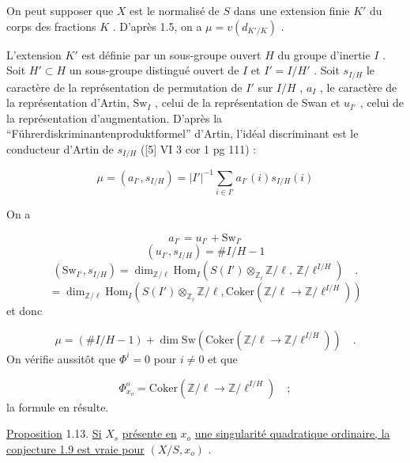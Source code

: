 On peut supposer que $X$ est le normalisé de $S$ dans une extension finie $K'$ du corps des fractions $K$ . D'après 1.5, on a $\mu = v(d_{K'/K})$ .

L'extension $K'$ est définie par un sous-groupe ouvert $H$ du groupe d'inertie $I$ . Soit $H' \subset H$ un sous-groupe distingué ouvert de $I$ et $I' = I/H'$ . Soit $s_{I/H}$ le caractère de la représentation de permutation de $I'$ sur $I/H$ , $a_I$ , le caractère de la représentation d'Artin, $\mathrm{Sw}_I$ , celui de la représentation de Swan et $u_{I'}$ , celui de la représentation d'augmentation. D'après la ``Führerdiskriminantenproduktformel'' d'Artin, l'idéal discriminant est le conducteur d'Artin de $s_{I/H}$ ([5] VI 3 cor 1 pg 111) :

\begin{equation*}
\mu = (a_{I'},s_{I/H}) = |I'|^{-1} \sum_{i \in I'} a_{I'}(i)s_{I/H}(i)
\end{equation*}


On a

\begin{equation*}
a_{I'} = u_{I'} + \mathrm{Sw}_{I'}
\end{equation*}
\begin{equation*}
(u_{I'},s_{I/H}) = \# I/H - 1
\end{equation*}
\begin{equation*}
(\mathrm{Sw}_{I'},s_{I/H}) = \dim_{\mathbb{Z}/\ell} \mathrm{Hom}_I(S(I') \otimes_{\mathbb{Z}_\ell} \mathbb{Z}/\ell, \ \mathbb{Z}/\ell^{I/H}) \quad .
\end{equation*}
\begin{equation*}
= \dim_{\mathbb{Z}/\ell} \mathrm{Hom}_I(S(I') \otimes_{\mathbb{Z}_\ell} \mathbb{Z}/\ell, \mathrm{Coker}( \mathbb{Z}/\ell \to \mathbb{Z}/\ell^{I/H}))
\end{equation*}
et donc

\begin{equation*}
\mu = (\# I/H - 1) + \dim \mathrm{Sw} (\mathrm{Coker}( \mathbb{Z}/\ell \to \mathbb{Z}/\ell^{I/H})) \quad .
\end{equation*}
On vérifie aussitôt que $\Phi^i = 0$ pour $i \neq 0$ et que

\begin{equation*}
\Phi^o_{x_o} = \mathrm{Coker}( \mathbb{Z}/\ell \to \mathbb{Z}/\ell^{I/H}) \quad ;
\end{equation*}
la formule en résulte.

\underline{Proposition} 1.13. \underline{Si} $X_s$ \underline{présente en} $x_o$ \underline{une singularité quadratique ordinaire, la conjecture 1.9 est vraie pour} $(X/S,x_o)$ .

